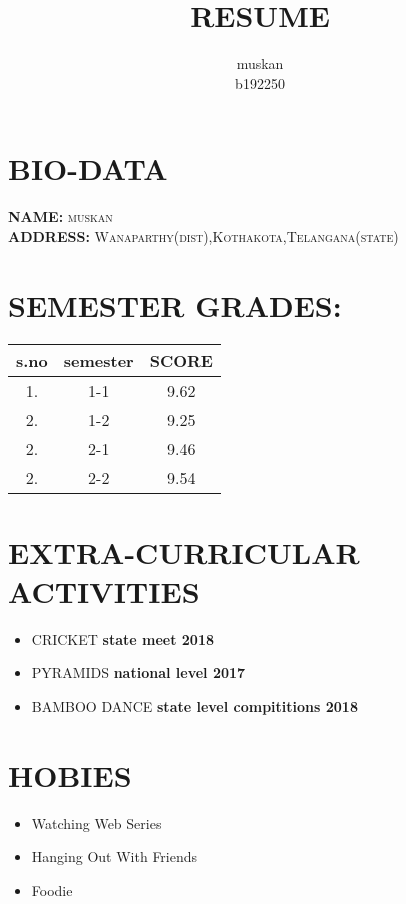 \documentclass[a3paper,10pt]{article}
\title{\textbf{RESUME}}
\author{muskan\\b192250}
\begin{document}
\pagecolor{lightgray}
\maketitle
\color{red}
\section{BIO-DATA}
\color{black}
\textbf{NAME:}
\textsc{muskan}\\
\textbf{ADDRESS:}
\textsc{Wanaparthy(dist),Kothakota,Telangana(state)}\\
\color{red}
\section{SEMESTER GRADES:}
\begin{table}[h]
\centering
 \begin{tabular}{|c |c |c |}
 \hline
 s.no & semester & SCORE\\
 \hline
 1. & 1-1 & 9.62\\
 \hline
 2. & 1-2 & 9.25\\
 \hline
 2. & 2-1 & 9.46\\
 \hline
 2. & 2-2 & 9.54\\
 \hline
 \end{tabular}

\end{table}
\color{red}
\section{EXTRA-CURRICULAR ACTIVITIES}
\color{black}
\begin{itemize}
 \item CRICKET \textbf{state meet 2018}
 \item PYRAMIDS \textbf{national level 2017}
 \item BAMBOO DANCE \textbf{state level compititions 2018}
\end{itemize}
\color{red}
\section{HOBIES}
\color{black}
\begin{itemize}
 \item Watching Web Series
 \item Hanging Out With Friends
 \item Foodie
\end{itemize}
\end{document}
